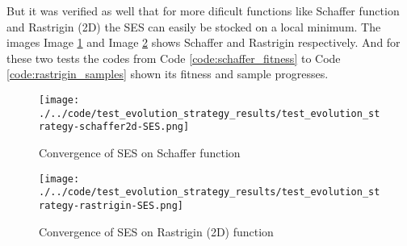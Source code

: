But it was verified as well that for more dificult functions like Schaffer function and Rastrigin (2D) the SES can easily be stocked on a local minimum. The images Image \ref{img:test_evolution_strategy-schaffer-SES} and Image \ref{img:test_evolution_strategy-rastrigin-SES} shows Schaffer and Rastrigin respectively. And for these two tests the codes from Code \ref{code:schaffer_fitness} to Code \ref{code:rastrigin_samples} shown its fitness and sample progresses.

\begin{figure}
  \begin{center}
  \texttt{[image: ./../code/test\_evolution\_strategy\_results/test\_evolution\_strategy-schaffer2d-SES.png]}
  \caption{Convergence of SES on Schaffer function}
  \label{img:test_evolution_strategy-schaffer-SES}
  \end{center}
\end{figure}





\begin{figure}
  \begin{center}
  \texttt{[image: ./../code/test\_evolution\_strategy\_results/test\_evolution\_strategy-rastrigin-SES.png]}
  \caption{Convergence of SES on Rastrigin (2D) function}
  \label{img:test_evolution_strategy-rastrigin-SES}
  \end{center}
\end{figure}





